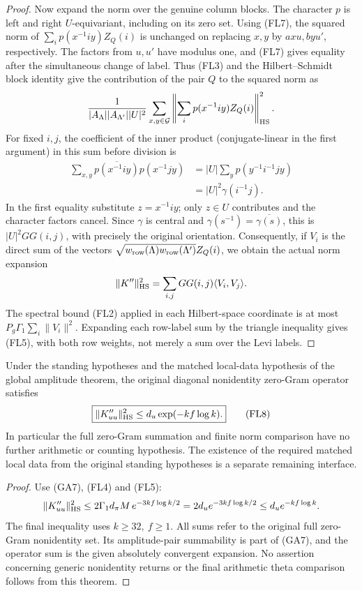 \begin{proof}
Now expand the norm over the genuine column blocks.
The character \(p\) is left and right \(U\)-equivariant,
including on its zero set. Using (FL7), the squared norm
of \(\sum_i p(x^{-1}iy)Z_Q(i)\) is unchanged on replacing
\(x,y\) by \(a x u,b y u'\), respectively. The factors
from \(u,u'\) have modulus one, and (FL7) gives equality
after the simultaneous change of label. Thus (FL3)
and the Hilbert--Schmidt block identity give the
contribution of the pair \(Q\) to the squared norm as
\[
 \frac{1}{|A_\Lambda||A_{\Lambda'}||U|^2}
  \sum_{x,y\in\mathcal G}
      \left\|\sum_i p(x^{-1}iy)Z_Q(i)\right\|_{\rm HS}^2 .
\]
For fixed \(i,j\), the coefficient of the inner product
(conjugate-linear in the first argument) in this sum before
division is
\[
 \begin{aligned}
 \sum_{x,y}\overline{p(x^{-1}iy)}p(x^{-1}jy)
 &=|U|\sum_y p(y^{-1}i^{-1}jy)\\
 &=|U|^2\gamma(i^{-1}j).
 \end{aligned}
\]
In the first equality substitute \(z=x^{-1}iy\); only
\(z\in U\) contributes and the character factors cancel.
Since \(\gamma\) is central and
\(\gamma(s^{-1})=\overline{\gamma(s)}\),
this is \(|U|^2 GG(i,j)\), with precisely the original
orientation. Consequently, if \(V_i\) is the direct sum
of the vectors
\(\sqrt{w_{\rm row}(\Lambda)w_{\rm row}(\Lambda')}Z_Q(i)\),
we obtain the actual norm expansion
\[
 \|K''\|_{\rm HS}^2=\sum_{i,j}GG(i,j)
                             \langle V_i,V_j\rangle .
\]
The spectral bound (FL2) applied in each Hilbert-space
coordinate is at most
\(P_g\Gamma_1\sum_i\|V_i\|^2\).
Expanding each row-label sum by the triangle inequality
gives (FL5), with both row weights, not merely a sum
over the Levi labels.
\end{proof}

\begin{theorem}
\label{thm:flag-zero-gram-saving}
Under the standing hypotheses and the matched local-data hypothesis
of the global amplitude theorem, the original diagonal
nonidentity zero-Gram operator satisfies
\[
 \boxed{\displaystyle
    \|K''_{uu}\|_{\rm HS}^2\le d_u\exp(-kf\log k).}
 \tag{FL8}
\]
In particular the full zero-Gram summation and finite norm
comparison have no further arithmetic or counting hypothesis.
The existence of the required matched local data from the
original standing hypotheses is a separate remaining interface.
\end{theorem}
\begin{proof}
Use (GA7), (FL4) and (FL5):
\[
 \|K''_{uu}\|_{\rm HS}^2
 \le 2\Gamma_1d_\pi M\,e^{-3kf\log k/2}
 =2d_u e^{-3kf\log k/2}
 \le d_u e^{-kf\log k}.
\]
The final inequality uses \(k\ge32,\ f\ge1\).
All sums refer to the original full zero-Gram nonidentity set.
Its amplitude-pair summability is part of (GA7), and the
operator sum is the given absolutely convergent expansion.
No assertion concerning generic nonidentity returns or the
final arithmetic theta comparison follows from this theorem.
\end{proof}
